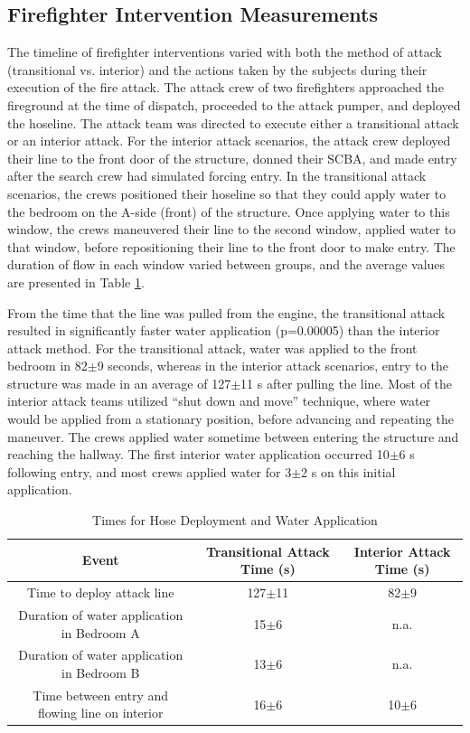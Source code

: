 \documentclass[12pt,oneside]{article}
\begin{document}
\subsection{Firefighter Intervention Measurements}
\label{subsec:ff_int}

The timeline of firefighter interventions varied with both the method of attack (transitional vs. interior) and the actions taken by the subjects during their execution of the fire attack. The attack crew of two firefighters approached the fireground at the time of dispatch, proceeded to the attack pumper, and deployed the hoseline. The attack team was directed to execute either a transitional attack or an interior attack. For the interior attack scenarios, the attack crew deployed their line to the front door of the structure, donned their SCBA, and made entry after the search crew had simulated forcing entry. In  the transitional attack scenarios, the crews positioned their hoseline so that they could apply water to the bedroom on the A-side (front) of the structure. Once applying water to this window, the crews maneuvered their line to the second window, applied water to that window, before repositioning their line to the front door to make entry. The duration of flow in each window varied between groups, and the average values are presented in Table \ref{tab:suppression_times}. 

From the time that the line was pulled from the engine, the transitional attack resulted in significantly faster water application (p=0.00005) than the interior attack method. For the transitional attack, water was applied to the front bedroom in 82$\pm$9 seconds, whereas in the interior attack scenarios, entry to the structure was made in an average of 127$\pm$11 s after pulling the line. Most of the interior attack teams utilized ``shut down and move'' technique, where water would be applied from a stationary position, before advancing and repeating the maneuver. The crews applied water sometime between entering the structure and reaching the hallway. The first interior water application occurred 10$\pm$6 s following entry, and most crews applied water for 3$\pm$2 s on this initial application. 

\begin{table}[!ht]
    \centering
    \caption{Times for Hose Deployment and Water Application}
    \label{tab:suppression_times}
    \begin{tabular}{ccc}
    \toprule[1.5pt]
 	 Event 											&	Transitional Attack Time (s)&	Interior Attack Time (s)\\
 	\midrule 
 	Time to deploy attack line 						& 127$\pm$11	& 82$\pm$9					\\
 	Duration of water application in Bedroom A 		& 15$\pm$6		& n.a.							\\
 	Duration of water application in Bedroom B 		& 13$\pm$6		& n.a.							\\
 	Time between entry and flowing line on interior & 16$\pm$6		& 10$\pm$6  						\\
 	\bottomrule[1.25pt] 
    \end{tabular}
\end{table}
\end{document}
